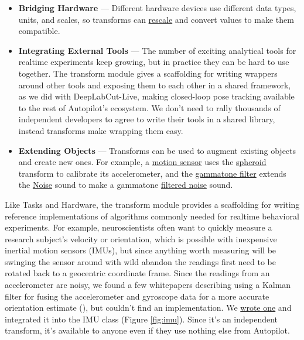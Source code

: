 \begin{itemize}
\item \textbf{Bridging Hardware} --- Different hardware devices use different data types, units, and scales, so transforms can \href{https://docs.auto-pi-lot.com/en/latest/transform/units.html\#autopilot.transform.units.Rescale}{rescale} and convert values to make them compatible.
\item \textbf{Integrating External Tools} --- The number of exciting analytical tools for realtime experiments keep growing, but in practice they can be hard to use together. The transform module gives a scaffolding for writing wrappers around other tools and exposing them to each other in a shared framework, as we did with DeepLabCut-Live\citep{kaneRealtimeLowlatencyClosedloop2020a}, making closed-loop pose tracking available to the rest of Autopilot's ecosystem. We don't need to rally thousands of independent developers to agree to write their tools in a shared library, instead transforms make wrapping them easy.
\item \textbf{Extending Objects} --- Transforms can be used to augment existing objects and create new ones. For example, a \href{https://docs.auto-pi-lot.com/en/latest/hardware/i2c.html#autopilot.hardware.i2c.I2C_9DOF}{motion sensor} uses the \href{https://docs.auto-pi-lot.com/en/latest/transform/geometry.html\#autopilot.transform.geometry.Spheroid}{spheroid} transform to calibrate its accelerometer, and the \href{https://docs.auto-pi-lot.com/en/latest/transform/timeseries.html\#autopilot.transform.timeseries.Gammatone}{gammatone filter} extends the \href{https://docs.auto-pi-lot.com/en/latest/stim/sound/sounds.html\#autopilot.stim.sound.sounds.Noise}{Noise} sound to make a gammatone \href{https://docs.auto-pi-lot.com/en/latest/stim/sound/sounds.html\#autopilot.stim.sound.sounds.Gammatone}{filtered noise} sound.
\end{itemize}

Like Tasks and Hardware, the transform module provides a scaffolding for writing reference implementations of algorithms commonly needed for realtime behavioral experiments. For example, neuroscientists often want to quickly measure a research subject's velocity or orientation, which is possible with inexpensive inertial motion sensors (IMUs), but since anything worth measuring will be swinging the sensor around with wild abandon the readings first need to be rotated back to a geocentric coordinate frame. Since the readings from an accelerometer are noisy, we found a few whitepapers describing using a Kalman filter for fusing the accelerometer and gyroscope data for a more accurate orientation estimate (\citep{abyarjooImplementingSensorFusion2015b,patonisFusionMethodCombining2018a}), but couldn't find an implementation. We \href{https://docs.auto-pi-lot.com/en/latest/_modules/autopilot/transform/geometry.html\#IMU_Orientation}{wrote one} and integrated it into the IMU class (Figure \ref{fig:imu}). Since it's an independent transform, it's available to anyone even if they use nothing else from Autopilot.

